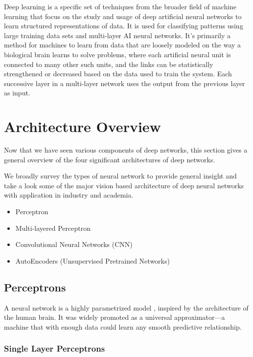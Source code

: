 Deep learning \cite{Polson2018} is a specific set of techniques from the broader field of machine learning that focus on the study and usage of deep artificial neural networks to learn structured representations of data. It is used for classifying patterns using large training data sets and multi-layer AI neural networks. It's primarily a method for machines to learn from data that are loosely modeled on the way a biological brain learns to solve problems, where each artificial neural unit is connected to many other such units, and the links can be statistically strengthened or decreased based on the data used to train the system. Each successive layer in a multi-layer network uses the output from the previous layer as input.

\section{Architecture Overview}

Now that we have seen various components of deep networks, this section gives a general overview of the four significant architectures of deep networks.

We broadly survey the types of neural network to provide general insight and take a look some of the major vision based architecture of deep neural networks with application in industry and academia. 

\begin{itemize}
\item Perceptron
\item  Multi-layered Perceptron
\item Convolutional Neural Networks (CNN)
\item AutoEncoders (Unsupervised Pretrained Networks)
\end{itemize}

\subsection{Perceptrons}

A neural network is a highly parametrized model \cite{efron2016computer}, inspired by the architecture of the human brain. It was widely promoted as a universal approximator—a machine that with enough data could learn any smooth predictive relationship.

\subsubsection*{Single Layer Perceptrons}

